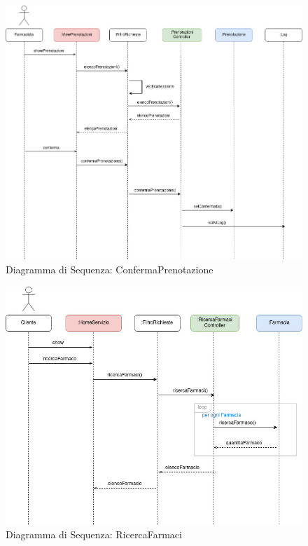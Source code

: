 \newpage

\begin{figure}[h!]
    \begin{center}
        \includegraphics[width=\textwidth]{immagini/Interazione-ConfermaPrenotazione-progettaz.jpg}
        \caption{Diagramma di Sequenza: ConfermaPrenotazione}
    \end{center}
\end{figure}

\newpage

\begin{figure}[h!]
    \begin{center}
        \includegraphics[width=\textwidth]{immagini/Interazione-RicercaFarmaco-progettaz.jpg}
        \caption{Diagramma di Sequenza: RicercaFarmaci}
    \end{center}
\end{figure}

